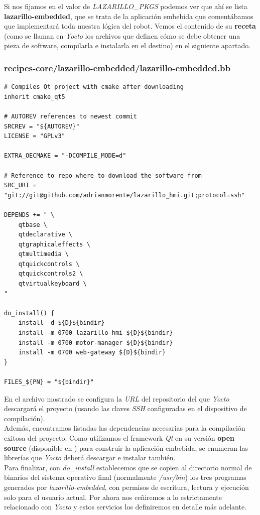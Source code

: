 Si nos fijamos en el valor de \emph{LAZARILLO\_PKGS} podemos ver que ahí se lista \textbf{lazarillo-embedded}, que se trata de la aplicación embebida que comentábamos que implementará toda nuestra lógica del robot. Vemos el contenido de su \textbf{receta} (como se llaman en \textit{Yocto} los archivos que definen cómo se debe obtener una pieza de software, compilarla e instalarla en el destino) en el siguiente apartado.\\


\subsubsection{recipes-core/lazarillo-embedded/lazarillo-embedded.bb}

\begin{lstlisting}
# Compiles Qt project with cmake after downloading
inherit cmake_qt5

# AUTOREV references to newest commit
SRCREV = "${AUTOREV}"
LICENSE = "GPLv3"

EXTRA_OECMAKE = "-DCOMPILE_MODE=d"

# Reference to repo where to download the software from
SRC_URI = "git://git@github.com/adrianmorente/lazarillo_hmi.git;protocol=ssh"

DEPENDS += " \
	qtbase \
	qtdeclarative \
	qtgraphicaleffects \
	qtmultimedia \
	qtquickcontrols \
	qtquickcontrols2 \
	qtvirtualkeyboard \
"

do_install() {
	install -d ${D}${bindir}
	install -m 0700 lazarillo-hmi ${D}${bindir}
	install -m 0700 motor-manager ${D}${bindir}
	install -m 0700 web-gateway ${D}${bindir}
}

FILES_${PN} = "${bindir}"
\end{lstlisting}

En el archivo mostrado se configura la \textit{URL} del repositorio del que \textit{Yocto} descargará el proyecto (usando las claves \textit{SSH} configuradas en el dispositivo de compilación).\\

Además, encontramos listadas las dependencias necesarias para la compilación exitosa del proyecto. Como utilizamos el framework \textit{Qt} en su versión \textbf{open source} (disponible en \cite{qt-open-source}) para construir la aplicación embebida, se enumeran las librerías que \textit{Yocto} deberá descargar e instalar también.\\

Para finalizar, con \emph{do\_install} establecemos que se copien al directorio normal de binarios del sistema operativo final (normalmente \emph{/usr/bin}) los tres programas generados por \emph{lazarillo-embedded}, con permisos de escritura, lectura y ejecución solo para el usuario actual. Por ahora nos ceñiremos a lo estrictamente relacionado con \textit{Yocto} y estos servicios los definiremos en detalle más adelante.\\


